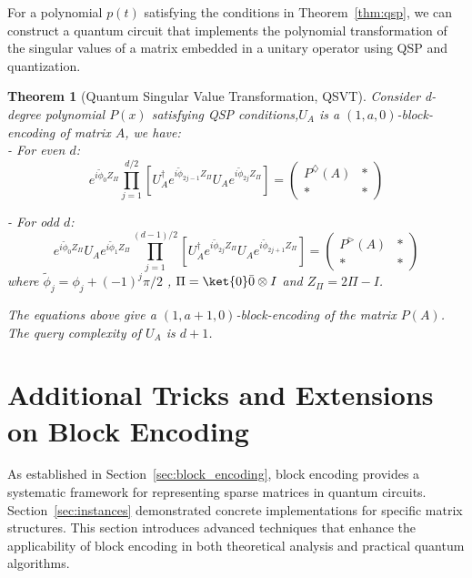 \documentclass{article}
\newtheorem{theorem}{Theorem}[section]
\begin{document}
For a polynomial $p(t)$ satisfying the conditions in Theorem~\ref{thm:qsp}, we can construct a quantum circuit that implements the polynomial transformation of the singular values of a matrix embedded in a unitary operator using QSP and quantization.

\begin{theorem}[Quantum Singular Value Transformation, QSVT]
  Consider d-degree polynomial $ P(x) $ satisfying QSP conditions,$U_A$ is a $(1,a,0)$-block-encoding of matrix $A$, we have:\\
  - For even $ d $:
  \begin{equation}
    e^{i\tilde{\phi}_0 Z_\Pi} \prod_{j=1}^{d/2} \left[ U_A^\dagger e^{i\tilde{\phi}_{2j-1} Z_\Pi} U_A e^{i\tilde{\phi}_{2j} Z_\Pi} \right] =
    \begin{pmatrix}
      P^\diamondsuit(A) & * \\
      *                 & *
    \end{pmatrix}
  \end{equation}

  - For odd $ d $:
  \begin{equation}
    e^{i\tilde{\phi}_0 Z_\Pi} U_A e^{i\tilde{\phi}_1 Z_\Pi} \prod_{j=1}^{(d-1)/2} \left[ U_A^\dagger e^{i\tilde{\phi}_{2j} Z_\Pi} U_A e^{i\tilde{\phi}_{2j+1} Z_\Pi} \right] =
    \begin{pmatrix}
      P^\vartriangleright(A) & * \\
      *                      & *
    \end{pmatrix}
  \end{equation}
  where $ \tilde{\phi}_j = \phi_j + (-1)^j \pi/2 $ , $\Pi = \ket{0}\bar{0}\otimes I$ and $ Z_\Pi = 2\Pi - I $.

  The equations above give a $(1,a+1,0)$-block-encoding of the matrix $P(A)$.
  The query complexity of $U_A$ is $d+1$.

  \label{thm:qsvt}
\end{theorem}

\section{Additional Tricks and Extensions on Block Encoding}

As established in Section~\ref{sec:block_encoding}, block encoding provides a systematic framework for representing sparse matrices in quantum circuits. Section~\ref{sec:instances} demonstrated concrete implementations for specific matrix structures. This section introduces advanced techniques that enhance the applicability of block encoding in both theoretical analysis and practical quantum algorithms.
\end{document}
